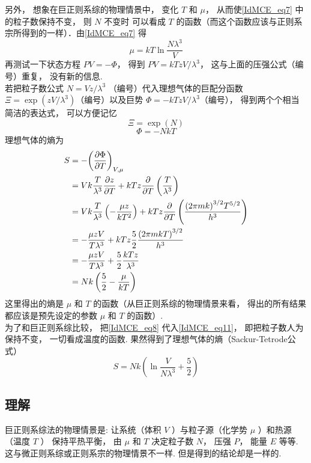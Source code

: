 另外， 想象在巨正则系综的物理情景中， 变化 $T$ 和 $\mu $，  从而使\autoref{IdMCE_eq7} 中的粒子数保持不变， 则 $N$ 不变时 可以看成 $T$ 的函数（而这个函数应该与正则系宗所得到的一样）．由\autoref{IdMCE_eq7} 得
  \begin{equation}\label{IdMCE_eq8}
    \mu  = kT\ln \frac{{N{\lambda ^3}}}{V}
  \end{equation}
  再测试一下状态方程 $PV =  - \Phi $，  得到 $PV = kT{{zV}}/{{{\lambda ^3}}}$，  这与上面的压强公式（编号）重复， 没有新的信息.\\
  若把粒子数公式 $N = {{Vz}}/{{{\lambda ^3}}}$ （编号）代入理想气体的巨配分函数 $\Xi  = \exp \left( {{{zV}}/{{{\lambda ^3}}}} \right)$（编号）以及巨势 $\Phi  =  - kT{{zV}}/{{{\lambda ^3}}}$（编号）， 得到两个个相当简洁的表达式， 可以方便记忆
  \begin{equation}\label{IdMCE_eq9}
    \Xi  = \exp \left( N \right)
  \end{equation}
  \begin{equation}\label{IdMCE_eq10}
  \Phi  =  - NkT
  \end{equation}
  理想气体的熵为
  \begin{equation}\label{IdMCE_eq11}
   \begin{aligned}
S &=  - {\left( {\frac{{\partial \Phi }}{{\partial T}}} \right)_{V,\mu }} \\
& = Vk\frac{T}{{{\lambda ^3}}}\frac{{\partial z}}{{\partial T}} + kTz\frac{\partial }{{\partial T}}\left( {\frac{T}{{{\lambda ^3}}}} \right) \\
 & = Vk\frac{T}{{{\lambda ^3}}}\left( { - \frac{{\mu z}}{{k{T^2}}}} \right) + kTz\frac{\partial }{{\partial T}}\left( {\frac{{{{(2\pi mk)}^{3/2}}{T^{5/2}}}}{{{h^3}}}} \right)\\
 & =  - \frac{{\mu zV}}{{T{\lambda ^3}}} + kTz\frac{5}{2}\frac{{{{(2\pi mkT)}^{3/2}}}}{{{h^3}}} \\
 & =  - \frac{{\mu zV}}{{T{\lambda ^3}}} + \frac{5}{2}\frac{{kTz}}{{{\lambda ^3}}} \\
 & = Nk\left( {\frac{5}{2} - \frac{\mu }{{kT}}} \right){\kern 1pt} {\kern 1pt} {\kern 1pt} {\kern 1pt} {\kern 1pt} {\kern 1pt} {\kern 1pt}
\end{aligned}
  \end{equation}
  这里得出的熵是 $\mu $ 和 $T$ 的函数（从巨正则系综的物理情景来看， 得出的所有结果都应该是预先设定的参数 $\mu $ 和 $T$ 的函数）.\\
  为了和巨正则系综比较， 把\autoref{IdMCE_eq8} 代入\autoref{IdMCE_eq11}，  即把粒子数人为保持不变， 一切看成温度的函数. 果然得到了理想气体的熵（Sackur-Tetrode公式）
  \begin{equation}\label{IdMCE_eq12}
   S = Nk\left( {\ln \frac{V}{{N{\lambda ^3}}} + \frac{5}{2}} \right)
  \end{equation}

\subsection{理解}

巨正则系综法的物理情景是: 让系统（体积 $V$ ）与粒子源（化学势 $\mu $ ）和热源（温度 $T$ ） 保持平热平衡， 由 $\mu $ 和 $T$ 决定粒子数 $N$，  压强 $P$，  能量 $E$ 等等. 这与微正则系综或正则系宗的物理情景不一样. 但是得到的结论却是一样的.

